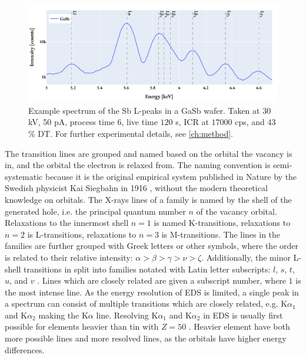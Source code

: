 \begin{figure}[p]
    \centering
    \includegraphics[width=0.99\linewidth]{figures/Sb_L-peaks_30kV_50pA.pdf}
    \caption{
        Example spectrum of the Sb L-peaks in a GaSb wafer.
        Taken at $30$ kV, $50$ pA, process time $6$, live time $120$ s, ICR at $17000$ cps, and $43$\% DT.
        For further experimental details, see \cref{ch:method}.
    }
    \label{fig:theory:xray_formation:Sb_L-peaks}
\end{figure}




The transition lines are grouped and named based on the orbital the vacancy is in, and the orbital the electron is relaxed from.
The naming convention is semi-systematic because it is the original empirical system published in Nature by the Swedish physicist Kai Siegbahn in 1916 \cite{siegbahn_relations_1916}, without the modern theoretical knowledge on orbitals.
The X-rays lines of a family is named by the shell of the generated hole, i.e. the principal quantum number $n$ of the vacancy orbital.
Relaxations to the innermost shell $n=1$ is named K-transitions, relaxations to $n=2$ is L-transitions, relaxations to $n=3$ is M-transitions.
The lines in the families are further grouped with Greek letters or other symbols, where the order is related to their relative intensity: $\alpha > \beta > \gamma > \nu > \zeta$.
Additionally, the minor L-shell transitions in split into families notated with Latin letter subscripts: $l$, $s$, $t$, $u$, and $v$ \cite[Ch. 4.2.4]{goldstein_scanning_2018}.
Lines which are closely related are given a subscript number, where $1$ is the most intense line.
As the energy resolution of EDS is limited, a single peak in a spectrum can consist of multiple transitions which are closely related, e.g. K$\alpha_1$ and K$\alpha_2$ making the K$\alpha$ line.
Resolving K$\alpha_1$ and K$\alpha_2$ in EDS is usually first possible for elements heavier than tin with $ Z = 50$ \cite[Ch. 8.2.2.3]{hollas_modern_2004}. %
Heavier element have both more possible lines and more resolved lines, as the orbitals have higher energy differences.


